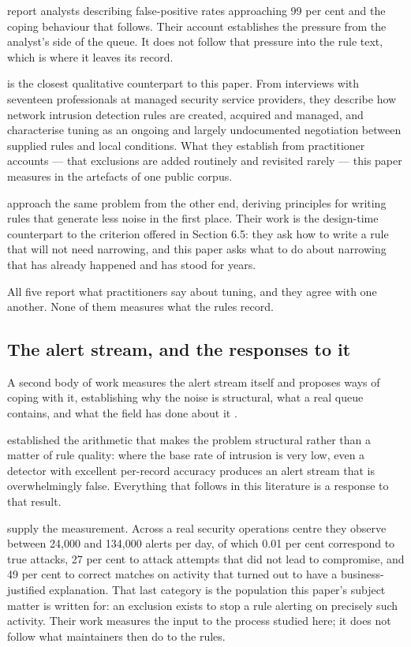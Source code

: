 \citet{alahmadi2022} report analysts describing false-positive rates approaching 99 per cent and the coping behaviour that follows. Their account establishes the pressure from the analyst's side of the queue. It does not follow that pressure into the rule text, which is where it leaves its record.

\citet{vermeer2023} is the closest qualitative counterpart to this paper. From interviews with seventeen professionals at managed security service providers, they describe how network intrusion detection rules are created, acquired and managed, and characterise tuning as an ongoing and largely undocumented negotiation between supplied rules and local conditions. What they establish from practitioner accounts --- that exclusions are added routinely and revisited rarely --- this paper measures in the artefacts of one public corpus.

\citet{teuwen2025} approach the same problem from the other end, deriving principles for writing rules that generate less noise in the first place. Their work is the design-time counterpart to the criterion offered in Section 6.5: they ask how to write a rule that will not need narrowing, and this paper asks what to do about narrowing that has already happened and has stood for years.

All five report what practitioners say about tuning, and they agree with one another. None of them measures what the rules record.

\subsection{The alert stream, and the responses to it}

A second body of work measures the alert stream itself and proposes ways of coping with it, establishing why the noise is structural, what a real queue contains, and what the field has done about it \citep{axelsson2000,vanede2022,wang2024,yang2024}.

\citet{axelsson2000} established the arithmetic that makes the problem structural rather than a matter of rule quality: where the base rate of intrusion is very low, even a detector with excellent per-record accuracy produces an alert stream that is overwhelmingly false. Everything that follows in this literature is a response to that result.

\citet{yang2024} supply the measurement. Across a real security operations centre they observe between 24,000 and 134,000 alerts per day, of which 0.01 per cent correspond to true attacks, 27 per cent to attack attempts that did not lead to compromise, and 49 per cent to correct matches on activity that turned out to have a business-justified explanation. That last category is the population this paper's subject matter is written for: an exclusion exists to stop a rule alerting on precisely such activity. Their work measures the input to the process studied here; it does not follow what maintainers then do to the rules.

